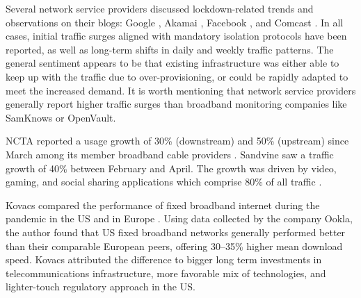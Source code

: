 \documentclass[conference,10pt]{IEEEtran}
\begin{document}
Several network service providers discussed lockdown-related trends and observations on their blogs: Google \cite{google}, Akamai \cite{akamai}, Facebook \cite{facebook}, and Comcast \cite{comcast}. In all cases, initial traffic surges aligned with mandatory isolation protocols have been reported, as well as long-term shifts in daily and weekly traffic patterns. The general sentiment appears to be that existing infrastructure was either able to keep up with the traffic due to over-provisioning, or could be rapidly adapted to meet the increased demand. It is worth mentioning that network service providers generally report higher traffic surges than broadband monitoring companies like SamKnows or OpenVault.

NCTA reported a usage growth of 30\% (downstream) and 50\% (upstream) since March among its member broadband cable providers \cite{ncta}. Sandvine saw a traffic growth of 40\% between February and April. The growth was driven by video, gaming, and social sharing applications which comprise 80\% of all traffic \cite{sandvine}.

Kovacs compared the performance of fixed broadband internet during the pandemic in the US and in Europe \cite{kovacs}. Using data collected by the company Ookla, the author found that US fixed broadband networks generally performed better than their comparable European peers, offering 30--35\% higher mean download speed. Kovacs attributed the difference to bigger long term investments in telecommunications infrastructure, more favorable mix of technologies, and lighter-touch regulatory approach in the US.


\end{document}
